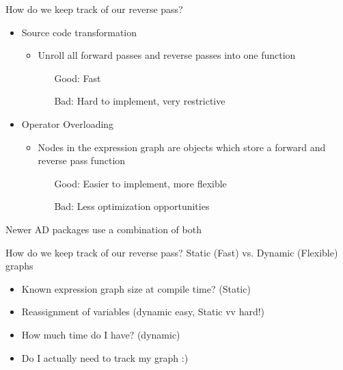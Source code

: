 \documentclass[dvipsnames]{beamer}
\begin{document}
\begin{frame}{How do we keep track of our reverse pass?}
\begin{itemize}
  \item Source code transformation
    \begin{itemize}
        \item Unroll all forward passes and reverse passes into one function
        \begin{itemize}
            \item[Good:] Fast
            \item[Bad:] Hard to implement, very restrictive
        \end{itemize}
    \end{itemize}
  \pause
    \item Operator Overloading
    \begin{itemize}
        \item Nodes in the expression graph are objects which store a forward and reverse pass function
        \begin{itemize}
          \item[Good:] Easier to implement, more flexible
          \item[Bad:] Less optimization opportunities
        \end{itemize}
    \end{itemize}
\end{itemize}
Newer AD packages use a combination of both
\end{frame}
\begin{frame}{How do we keep track of our reverse pass?}
Static (Fast) vs. Dynamic (Flexible) graphs 
\begin{itemize}
\item Known expression graph size at compile time? (Static)
\item Reassignment of variables (dynamic easy, Static vv hard!)
\item How much time do I have? (dynamic)
\pause
\item Do I actually need to track my graph :)
\end{itemize}
\end{frame}
\end{document}
